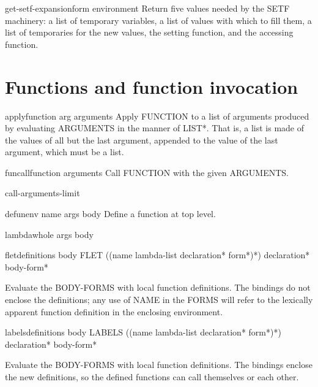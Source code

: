 \documentclass[10pt,english]{book}
\begin{document}
\begin{function}{get-setf-expansion}{form \op environment}
  Return five values needed by the SETF machinery: a list of temporary
   variables, a list of values with which to fill them, a list of temporaries
   for the new values, the setting function, and the accessing function.
\end{function}

\section{Functions and function invocation}
\label{sec:function-invocation}

\begin{function}{apply}{function arg \rest arguments}
  Apply FUNCTION to a list of arguments produced by evaluating ARGUMENTS in
  the manner of LIST*. That is, a list is made of the values of all but the
  last argument, appended to the value of the last argument, which must be a
  list.
\end{function}

\begin{function}{funcall}{function \rest arguments}
  Call FUNCTION with the given ARGUMENTS.
\end{function}

\begin{constant}{call-arguments-limit}{}
  
\end{constant}

\begin{macro}{defun}{\env env name args \body body}
  Define a function at top level.
\end{macro}

\begin{macro}{lambda}{\whole whole args \body body}
  
\end{macro}

\begin{specialop}{flet}{definitions \body body}
  FLET ({(name lambda-list declaration* form*)}*) declaration* body-form*

Evaluate the BODY-FORMS with local function definitions. The bindings do
not enclose the definitions; any use of NAME in the FORMS will refer to the
lexically apparent function definition in the enclosing environment.
\end{specialop}

\begin{specialop}{labels}{definitions \body body}
  LABELS ({(name lambda-list declaration* form*)}*) declaration* body-form*

Evaluate the BODY-FORMS with local function definitions. The bindings enclose
the new definitions, so the defined functions can call themselves or each
other.
\end{specialop}
\end{document}
